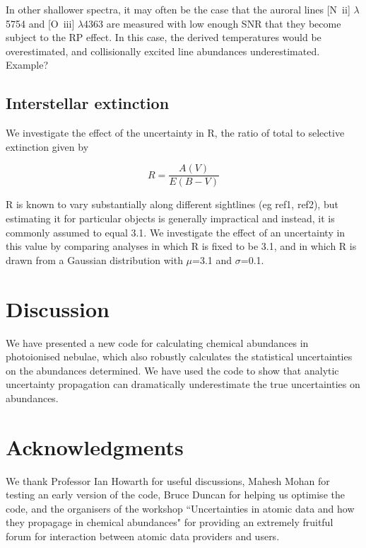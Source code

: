 \documentclass[useAMS,usenatbib]{mn2e}
\begin{document}
In other shallower spectra, it may often be the case that the auroral lines [N~{\sc ii}] $\lambda$5754 and [O~{\sc iii}] $\lambda$4363 are measured with low enough SNR that they become subject to the RP effect.  In this case, the derived temperatures would be overestimated, and collisionally excited line abundances underestimated.  Example?

\subsection{Interstellar extinction}

We investigate the effect of the uncertainty in R, the ratio of total to selective extinction given by

\begin{equation}
R = \frac{A(V)}{E(B-V)}
\end{equation}

R is known to vary substantially along different sightlines (eg ref1, ref2), but estimating it for particular objects is generally impractical and instead, it is commonly assumed to equal 3.1.  We investigate the effect of an uncertainty in this value by comparing analyses in which R is fixed to be 3.1, and in which R is drawn from a Gaussian distribution with $\mu$=3.1 and $\sigma$=0.1.

\section{Discussion}

We have presented a new code for calculating chemical abundances in photoionised nebulae, which also robustly calculates the statistical uncertainties on the abundances determined.  We have used the code to show that analytic uncertainty propagation can dramatically underestimate the true uncertainties on abundances.

\section*{Acknowledgments}

We thank Professor Ian Howarth for useful discussions, Mahesh Mohan for testing an early version of the code, Bruce Duncan for helping us optimise the code, and the organisers of the workshop ``Uncertainties in atomic data and how they propagage in chemical abundances" for providing an extremely fruitful forum for interaction between atomic data providers and users.





\label{lastpage}
\end{document}
